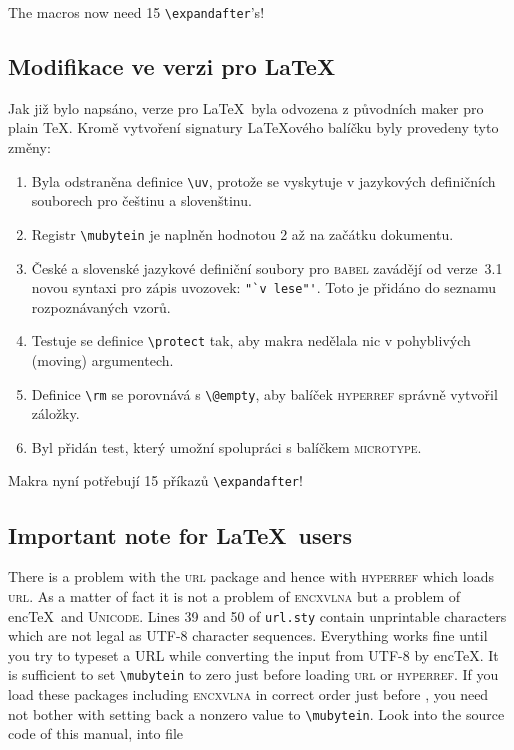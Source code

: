The macros now need 15 \verb;\expandafter;'s!

\else

\subsection{Modifikace ve verzi pro \LaTeX}
Jak již bylo napsáno, verze pro \LaTeX\ byla odvozena z původních maker pro plain \TeX. Kromě
vytvoření signatury \LaTeX ového balíčku byly provedeny tyto změny:

\begin{enumerate}
\item Byla odstraněna definice \verb;\uv;, protože se vyskytuje v jazykových definičních souborech
pro češtinu a slovenštinu.
\item Registr \verb;\mubytein; je naplněn hodnotou 2 až na začátku dokumentu.
\item České a slovenské jazykové definiční soubory pro \textsc{babel} zavádějí od verze~3.1 novou
syntaxi pro zápis uvozovek: \verb;"`v lese"';. Toto je přidáno do seznamu rozpoznávaných vzorů.
\item Testuje se definice \verb;\protect; tak, aby makra nedělala nic v pohyblivých (moving)
argumentech.
\item Definice \verb;\rm; se porovnává s \verb;\@empty;, aby balíček \textsc{hyperref} správně
vytvořil záložky.
\item Byl přidán test, který umožní spolupráci s balíčkem \textsc{microtype}.
\end{enumerate}

Makra nyní potřebují 15 příkazů \verb;\expandafter;!

\fi


\ifeng

\subsection{Important note for \LaTeX\ users}
There is a problem with the \textsc{url} package and hence with \textsc{hyperref} which loads
\textsc{url}. As a matter of fact it is not a problem of \textsc{encxvlna} but a problem of enc\TeX\
and \textsc{Unicode}. Lines 39 and 50 of \texttt{url.sty} contain unprintable characters which are
not legal as UTF-8 character sequences. Everything works fine until you try to typeset a URL while
converting the input from UTF-8 by enc\TeX. It is sufficient to set \verb;\mubytein; to zero just
before loading \textsc{url} or \textsc{hyperref}. If you load these packages including
\textsc{encxvlna} in correct order just
before \verb;;, you need not bother with setting back a nonzero value to
\verb;\mubytein;. Look into the source code of this manual, into file
\else


